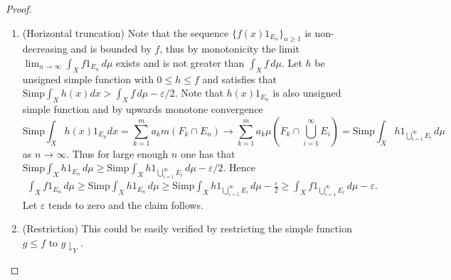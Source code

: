 \documentclass[a4paper]{article}
\begin{document}
\begin{proof}
\begin{enumerate}[label = (\roman*)]
    \emph{Case 2}: $\mathrm{Simp}\int_X g \,d\mu < +\infty$. Since $g$ is unsigned simple, by Venn Diagram
    one can write $g(x) = +\infty \cdot 1_E(x) + \sum_{i = 1}^n c_i 1_{E_i}(x)$ where each $c_i \in [0, +\infty)$ and 
    $E, \{E_i\}$ are pairwisely disjoint with $\mu(E) = 0$. Thus for large enough $n$ one has that $\sum_{i = 1}^n c_i 1_{E_i}(x)
    \leq \min(f(x), n), \forall x \in X$. Hence $$
    \lim_{n \to \infty} \int_X \min(f,n) \,d\mu \geq \mathrm{Simp}\int_X g \,d\mu
    \geq \int_X f \,d\mu - \varepsilon,
    $$let $\varepsilon \to 0$ to finish the proof.
    \item (Horizontal truncation) Note that the sequence $\{f(x)1_{E_n}\}_{n \geq 1}$ is non-decreasing and is bounded
    by $f$, thus by monotonicity the limit $\lim_{n \to \infty} \int_X f1_{E_n} \,d\mu$ exists
    and is not greater than $\int_X f \,d\mu$. Let $h$ be unsigned simple function with $0 \leq h \leq f$
    and satisfies that $\mathrm{Simp}\int_X h(x) dx > \int_X f \,d\mu - \varepsilon / 2$.
    Note that $h(x)1_{E_n}$ is also unsigned simple function and by upwards monotone convergence $$
    \mathrm{Simp}\int_X h(x)1_{E_n} dx = \sum_{k = 1}^m a_km(F_k \cap E_n) \to
    \sum_{k = 1}^m a_k \mu(F_k \cap \bigcup_{i = 1}^\infty E_i) = \mathrm{Simp}\int_X h1_{\bigcup_{i = 1}^\infty E_i}\,d\mu
    $$as $n \to \infty$. Thus for large enough $n$ one has that $\mathrm{Simp}\int_X h1_{E_n} \,d\mu
    \geq \mathrm{Simp}\int_X h1_{\bigcup_{i = 1}^\infty E_i}\,d\mu - \varepsilon / 2$. Hence \begin{align*}
    \int_X f1_{E_n} \,d\mu \geq \mathrm{Simp}\int_X h1_{E_n} \,d\mu
    \geq \mathrm{Simp}\int_X h1_{\bigcup_{i = 1}^\infty E_i} \,d\mu - \frac{\varepsilon}{2} \geq 
    \int_X f1_{\bigcup_{i = 1}^\infty E_i}\,d\mu - \varepsilon.
    \end{align*}
    Let $\varepsilon$ tends to zero and the claim follows.
    \item (Restriction) This could be easily verified by restricting the simple function $g \leq f$ to $g\downharpoonright_Y$.\qedhere
\end{enumerate}
\end{proof}
\end{document}
